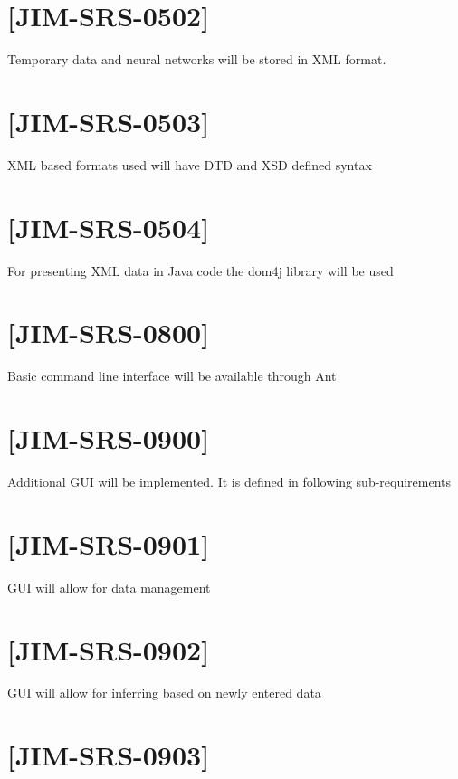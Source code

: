 \documentclass[10pt,oneside]{memoir}
\begin{document}
\section{[JIM-SRS-0502]}
\label{jim-srs-0502}

Temporary data and neural networks will be stored in XML format.


\section{[JIM-SRS-0503]}
\label{jim-srs-0503}

XML based formats used will have DTD and XSD defined syntax


\section{[JIM-SRS-0504]}
\label{jim-srs-0504}

For presenting XML data in Java code the dom4j library will be used


\section{[JIM-SRS-0800]}
\label{jim-srs-0800}

Basic command line interface will be available through Ant


\section{[JIM-SRS-0900]}
\label{jim-srs-0900}

Additional GUI will be implemented. It is defined in following sub-requirements


\section{[JIM-SRS-0901]}
\label{jim-srs-0901}

GUI will allow for data management


\section{[JIM-SRS-0902]}
\label{jim-srs-0902}

GUI will allow for inferring based on newly entered data


\section{[JIM-SRS-0903]}
\label{jim-srs-0903}
\end{document}
